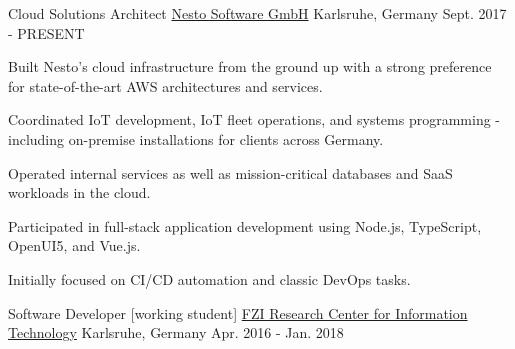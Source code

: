 

\begin{cventries}

\cventry
{Cloud Solutions Architect} %
{\href{https://nesto-software.de/}{Nesto Software GmbH}} %
{Karlsruhe, Germany} %
{Sept. 2017 - PRESENT} %
{
  \begin{cvitems} %
    \item {Built Nesto's cloud infrastructure from the ground up with a strong preference for state-of-the-art AWS architectures and services.}
    \item {Coordinated IoT development, IoT fleet operations, and systems programming - including on-premise installations for clients across Germany.}
    \item {Operated internal services as well as mission-critical databases and SaaS workloads in the cloud.}
    \item {Participated in full-stack application development using Node.js, TypeScript, OpenUI5, and Vue.js.}
    \item {Initially focused on CI/CD automation and classic DevOps tasks.}
  \end{cvitems}
}

\cventry
{Software Developer [working student]} %
{\href{https://www.fzi.de/}{FZI Research Center for Information Technology}} %
{Karlsruhe, Germany} %
{Apr. 2016 - Jan. 2018} %
{
  \begin{cvitems} %
  \end{cvitems}
}


\end{cventries}
